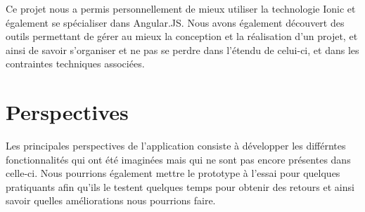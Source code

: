\documentclass[pidr]{tnreport}
\begin{document}
Ce projet nous a permis personnellement de mieux utiliser la technologie Ionic et également se spécialiser dans Angular.JS. Nous avons également découvert des outils permettant de gérer au mieux la conception et la réalisation d’un projet, et ainsi de savoir s’organiser et ne pas se perdre dans l’étendu de celui-ci, et dans les contraintes techniques associées.

\section{Perspectives}

Les principales perspectives de l’application consiste à développer les différntes fonctionnalités qui ont été imaginées mais qui ne sont pas encore présentes dans celle-ci. Nous pourrions également mettre le prototype à l'essai pour quelques pratiquants afin qu'ils le testent quelques temps pour obtenir des retours et ainsi savoir quelles améliorations nous pourrions faire.




\listoffigures
\end{document}
